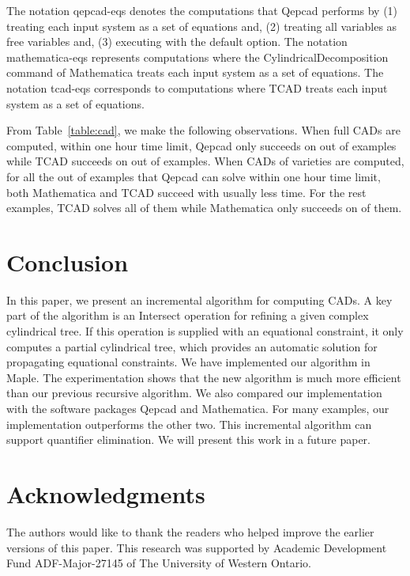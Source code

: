 \documentclass[10pt]{article}
\newcommand{\TCAD}{{\sc TCAD}}
\newcommand{\CAD}{{CAD}}
\newcommand{\QEPCAD}{{\sc Qepcad}}
\begin{document}
\begin{center}
The notation qepcad-eqs denotes the computations 
that {\QEPCAD} performs by (1) treating each input system as a set of 
equations and, (2) treating all variables as free 
variables and, (3) executing with the default option.
The notation mathematica-eqs represents
computations where the {\sf CylindricalDecomposition} command 
of {\sf Mathematica} treats each input system as a set of equations.
The notation tcad-eqs corresponds to  computations where {\TCAD}
treats each input system as a set of equations.

From Table~\ref{table:cad}, we make the following observations.
When full {\CAD}s are computed, within one hour time limit, 
{\QEPCAD} only succeeds on  out of  examples while
{\TCAD} succeeds on  out of  examples. 
When {\CAD}s of varieties are computed, 
for all the  out of  examples that {\QEPCAD}
can solve within one hour time limit, 
both {\sf Mathematica} and {\sf TCAD}
succeed with usually less time. 
For the rest  examples, {\sf TCAD}
solves all of them while {\sf Mathematica} 
only succeeds on  of them.


\section{Conclusion}
In this paper, we present an incremental algorithm for computing CADs.
A key part of the algorithm is an {\sf Intersect} 
operation for refining a given complex cylindrical tree. 
If this operation is supplied with an equational constraint,
it only computes a partial cylindrical tree, which 
provides an automatic solution for propagating equational constraints.
We have implemented our algorithm in {\sc Maple}. 
The experimentation 
shows that the new algorithm is much more efficient than
our previous recursive algorithm. 
We also compared our implementation with the software packages 
{\QEPCAD} and {\sf Mathematica}. 
For many examples, our implementation outperforms the other two. 
This incremental algorithm can support quantifier elimination. 
We will present this work in a future paper.

\section*{Acknowledgments} 
The authors would like to thank the
readers who helped improve the earlier versions 
of this paper.
This research was supported by 
Academic Development Fund ADF-Major-27145
of The University of Western Ontario.



\begin{thebibliography}{10}


\end{thebibliography}
\end{center}
\end{document}
